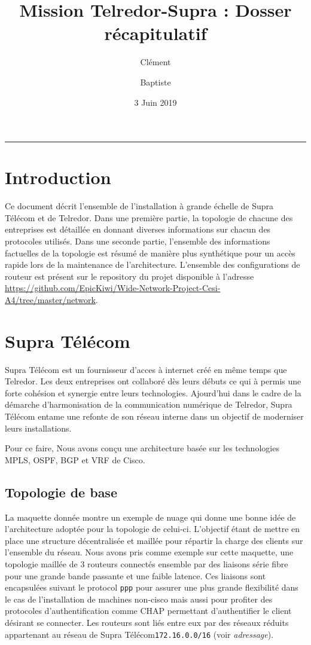\documentclass{article}
\title{Mission Telredor-Supra : Dosser récapitulatif}
\date{3 Juin 2019}
\author{Clément \bsc{Boutin} \and Baptiste \bsc{Saclier}}
\newcommand{\tlr}{Telredor\xspace}
\newcommand{\spr}{Supra Télécom\xspace}
\begin{document}
\maketitle

\begin{center}
\rule{0.5\textwidth}{0.4pt}
\end{center}

\tableofcontents

\section{Introduction}

Ce document décrit l'ensemble de l'installation à grande échelle de \spr et de \tlr. 
Dans une première partie, la topologie de chacune des entreprises est détaillée en donnant diverses informations sur chacun des protocoles utilisés.
Dans une seconde partie, l'ensemble des informations factuelles de la topologie est résumé de manière plus synthétique pour un accès rapide lors de la maintenance de l'architecture.
L'ensemble des configurations de routeur est présent sur le repository du projet disponible à l'adresse \url{https://github.com/EpicKiwi/Wide-Network-Project-Cesi-A4/tree/master/network}.

\section{\spr}

\spr est un fournisseur d'acces à internet créé en même temps que \tlr.
Les deux entreprises ont collaboré dès leurs débuts ce qui à permis une forte cohésion et synergie entre leurs technologies.
Ajourd'hui dans le cadre de la démarche d'harmonisation de la communication numérique de \tlr, \spr entame une refonte de son réseau interne dans un objectif de moderniser leurs installations.

Pour ce faire, Nous avons conçu une architecture basée sur les technologies MPLS, OSPF, BGP et VRF de Cisco.

\subsection{Topologie de base}

La maquette donnée montre un exemple de nuage qui donne une bonne idée de l'architecture adoptée pour la topologie de celui-ci.
L'objectif étant de mettre en place une structure décentralisée et maillée pour répartir la charge des clients sur l'ensemble du réseau.
Nous avons pris comme exemple sur cette maquette, une topologie maillée de 3 routeurs connectés ensemble par des liaisons série fibre pour une grande bande passante et une faible latence.
Ces liaisons sont encapsulées suivant le protocol \texttt{ppp} pour assurer une plus grande flexibilité dans le cas de l'installation de machines non-cisco mais aussi pour profiter des protocoles d'authentification comme CHAP permettant d'authentifier le client désirant se connecter.
Les routeurs sont liés entre eux par des réseaux réduits appartenant au réseau de \spr \texttt{172.16.0.0/16} (voir \emph{adressage}).
\end{document}

